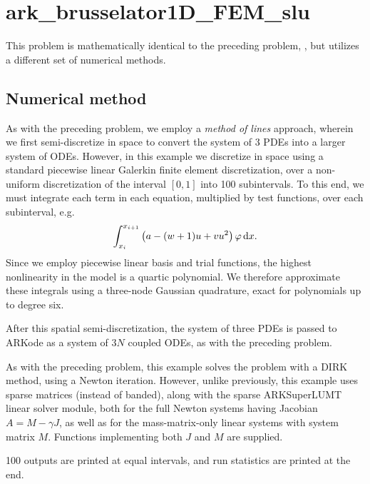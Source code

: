\documentclass[letterpaper,10pt,english]{sphinxmanual}
\begin{document}
\section{ark\_brusselator1D\_FEM\_slu}
\label{c_serial:id20}\label{c_serial:ark-brusselator1d-fem-slu}
This problem is mathematically identical to the preceding problem,
{\hyperref[c_serial:ark-brusselator1d]{\emph{}}}, but utilizes a different set of numerical
methods.


\subsection{Numerical method}
\label{c_serial:id21}
As with the preceding problem, we employ a \emph{method of lines} approach,
wherein we first semi-discretize in space to convert the system of 3
PDEs into a larger system of ODEs.  However, in this example we
discretize in space using a standard piecewise linear Galerkin finite
element discretization, over a non-uniform discretization of the
interval \([0,1]\) into 100 subintervals.  To this end, we must
integrate each term in each equation, multiplied by test functions,
over each subinterval, e.g.
\begin{gather}
\begin{split}\int_{x_i}^{x_{i+1}} \left(a - (w+1) u + v u^2\right) \varphi\,\mathrm dx.\end{split}\notag
\end{gather}
Since we employ piecewise linear basis and trial functions, the
highest nonlinearity in the model is a quartic polynomial.  We
therefore approximate these integrals using a three-node Gaussian
quadrature, exact for polynomials up to degree six.

After this spatial semi-discretization, the system of three PDEs is
passed to ARKode as a system of \(3N\) coupled ODEs, as with the
preceding problem.

As with the preceding problem, this example solves the problem with a
DIRK method, using a Newton iteration.  However, unlike previously,
this example uses sparse matrices (instead of banded), along with the
sparse ARKSuperLUMT linear solver module, both for the full Newton
systems having Jacobian \(A=M-\gamma J\), as well as for the
mass-matrix-only linear systems with system matrix \(M\).
Functions implementing both \(J\) and \(M\) are supplied.

100 outputs are printed at equal intervals, and run statistics
are printed at the end.
\end{document}
